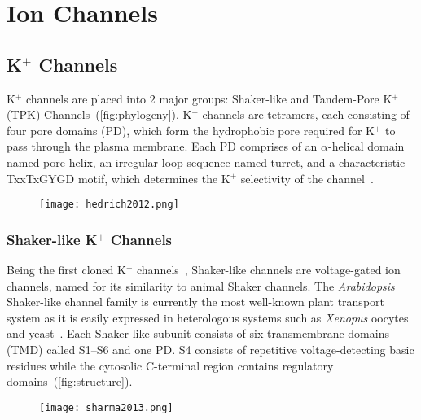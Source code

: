\documentclass[11pt]{article}
\begin{document}
\begin{multicols*}{2}
\begin{table*}
\begin{tabular}{llll}
\end{tabular}
\end{table*}

\section{Ion Channels}
\subsection{K$^{+}$ Channels}
K$^{+}$ channels are placed into 2 major groups: Shaker-like and Tandem-Pore K$^{+}$ (TPK) Channels~(\autoref{fig:phylogeny})\citep{Voelker2010}. K$^{+}$ channels are tetramers, each consisting of four pore domains (PD), which form the hydrophobic pore required for K$^{+}$ to pass through the plasma membrane. Each PD comprises of an $\alpha$-helical domain named pore-helix, an irregular loop sequence named turret, and a characteristic TxxTxGYGD motif, which determines the K$^{+}$ selectivity of the channel~\citep{Schachtman1991}.

\begin{figure}[H]
  \centering
    \texttt{[image: hedrich2012.png]}
  \label{fig:phylogeny}
\end{figure}

\subsubsection{Shaker-like K$^{+}$ Channels}
Being the first cloned K$^{+}$ channels~\citep{Anderson1992}, Shaker-like channels are voltage-gated ion channels, named for its similarity to animal Shaker channels. The \textit{Arabidopsis} Shaker-like channel family is currently the most well-known plant transport system as it is easily expressed in heterologous systems such as \textit{Xenopus} oocytes and yeast~\citep{Dreyer2009,Ros1999}. Each Shaker-like subunit consists of six transmembrane domains (TMD) called S1--S6 and one PD. S4 consists of repetitive voltage-detecting basic residues while the cytosolic C-terminal region contains regulatory domains~(\autoref{fig:structure})\citep{Very2003}. \newline

\begin{figure*}
  \centering
    \texttt{[image: sharma2013.png]}
  \label{fig:structure}
\end{figure*}


\end{multicols*}
\end{document}
